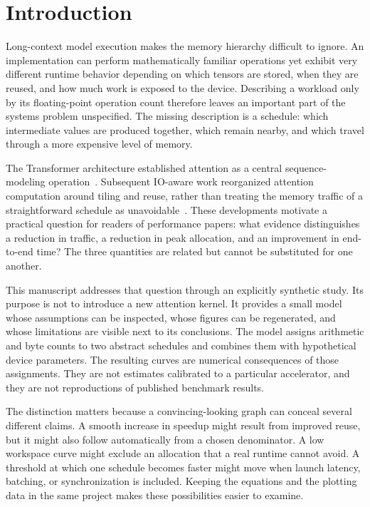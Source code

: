 \section{Introduction}
\label{sec:intro}
Long-context model execution makes the memory hierarchy difficult to ignore. An implementation can perform mathematically familiar operations yet exhibit very different runtime behavior depending on which tensors are stored, when they are reused, and how much work is exposed to the device. Describing a workload only by its floating-point operation count therefore leaves an important part of the systems problem unspecified. The missing description is a schedule: which intermediate values are produced together, which remain nearby, and which travel through a more expensive level of memory.

The Transformer architecture established attention as a central sequence-modeling operation~\cite{vaswani2017attention}. Subsequent IO-aware work reorganized attention computation around tiling and reuse, rather than treating the memory traffic of a straightforward schedule as unavoidable~\cite{dao2022flashattention}. These developments motivate a practical question for readers of performance papers: what evidence distinguishes a reduction in traffic, a reduction in peak allocation, and an improvement in end-to-end time? The three quantities are related but cannot be substituted for one another.

This manuscript addresses that question through an explicitly synthetic study. Its purpose is not to introduce a new attention kernel. It provides a small model whose assumptions can be inspected, whose figures can be regenerated, and whose limitations are visible next to its conclusions. The model assigns arithmetic and byte counts to two abstract schedules and combines them with hypothetical device parameters. The resulting curves are numerical consequences of those assignments. They are not estimates calibrated to a particular accelerator, and they are not reproductions of published benchmark results.

The distinction matters because a convincing-looking graph can conceal several different claims. A smooth increase in speedup might result from improved reuse, but it might also follow automatically from a chosen denominator. A low workspace curve might exclude an allocation that a real runtime cannot avoid. A threshold at which one schedule becomes faster might move when launch latency, batching, or synchronization is included. Keeping the equations and the plotting data in the same project makes these possibilities easier to examine.

